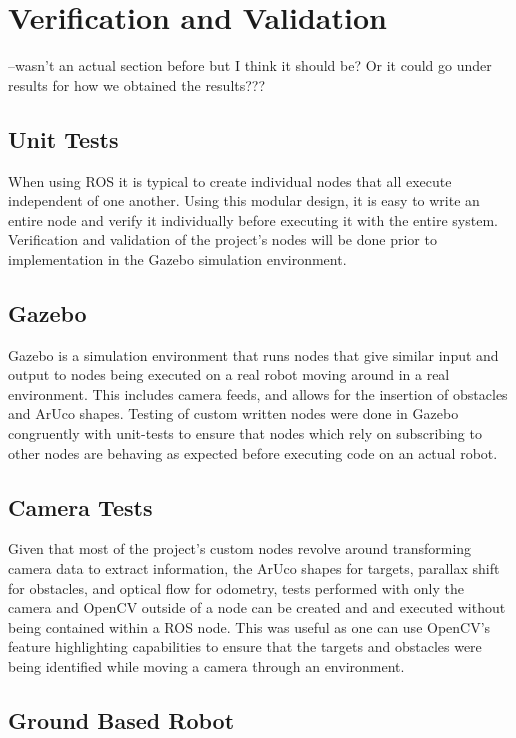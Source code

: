 \documentclass{article}
\begin{document}
	
\section{Verification and Validation} --wasn't an actual section before but I think it should be? Or it could go under results for how we obtained the results???
	
		\subsection{Unit Tests}
	
	When using ROS it is typical to create individual nodes that all execute independent of one another. Using this modular design, it is easy to write an entire node and verify it individually before executing it with the entire system. Verification and validation of the project's nodes will be done prior to implementation in the Gazebo simulation environment. 
	
		\subsection{Gazebo}
	
	Gazebo is a simulation environment that runs nodes that give similar input and output to nodes being executed on a real robot moving around in a real environment. This includes camera feeds, and allows for the insertion of obstacles and ArUco shapes. Testing of custom written nodes were done in Gazebo congruently with unit-tests to ensure that nodes which rely on subscribing to other nodes are behaving as expected before executing code on an actual robot.
	
		\subsection{Camera Tests}
	
	Given that most of the project's custom nodes revolve around transforming camera data to extract information, the ArUco shapes for targets, parallax shift for obstacles, and optical flow for odometry, tests performed with only the camera and OpenCV outside of a node can be created and and executed without being contained within a ROS node. This was useful as one can use OpenCV's feature highlighting capabilities to ensure that the targets and obstacles were being identified while moving a camera through an environment. 
	
		\subsection{Ground Based Robot}
	
\end{document}

